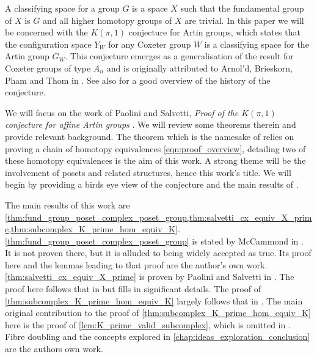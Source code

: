 \documentclass[class=guthesis, crop=false]{standalone}
\begin{document}
A classifying space for a group $G$ is a space $X$ such that the fundamental group of $X$ is $G$ and all higher homotopy groups of $X$ are trivial.
In this paper we will be concerned with the $K(\pi,1)$ conjecture for Artin groups, which states that the configuration space $Y_W$ for any Coxeter group $W$ is a classifying space for the Artin group $G_W$.  This conjecture emerges as a generalisation of the result for Coxeter groups of type $A_n$ and is originally attributed to Arnol'd, Brieskorn, Pham and Thom in \cite{paris_kpi1_2014}. See also \cite{charney_davis_pi_1995} for a good overview of the history of the conjecture.

We will focus on the work of Paolini and Salvetti, \emph{Proof of the $K(\pi, 1)$ conjecture for affine Artin groups} \cite{paolini_salvetti_kpi1_2021}. We will review some theorems therein and provide relevant background. The theorem which is the namesake of \cite{paolini_salvetti_kpi1_2021} relies on proving a chain of homotopy equivalences \eqref{eqn:proof_overview}, detailing two of these homotopy equivalences is the aim of this work. A strong theme will be the involvement of posets and related structures, hence this work's title. We will begin by providing a birds eye view of the conjecture and the  main results of \cite{paolini_salvetti_kpi1_2021}.

The main results of this work are \cref{thm:fund_group_poset_complex_poset_group,thm:salvetti_cx_equiv_X_prime,thm:subcomplex_K_prime_hom_equiv_K}.
\cref{thm:fund_group_poset_complex_poset_group} is stated by McCammond in \cite{mccammond_introduction_2005}. It is not proven there, but it is alluded to being widely accepted as true. Its proof here and the lemmas leading to that proof are the author's own work.
\cref{thm:salvetti_cx_equiv_X_prime} is proven by Paolini and Salvetti in \cite{paolini_salvetti_kpi1_2021}. The proof here follows that in \cite{paolini_salvetti_kpi1_2021} but fills in significant details.
The proof of \cref{thm:subcomplex_K_prime_hom_equiv_K} largely follows that in \cite{paolini_salvetti_kpi1_2021}. The main original contribution to the proof of \cref{thm:subcomplex_K_prime_hom_equiv_K} here is the proof of \cref{lem:K_prime_valid_subcomplex}, which is omitted in \cite{paolini_salvetti_kpi1_2021}.
Fibre doubling and the concepts explored in \cref{chap:ideas_exploration_conclusion} are the authors own work.
\end{document}
